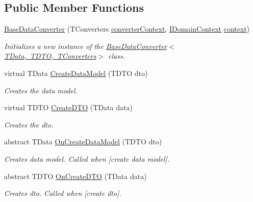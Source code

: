 \subsection*{Public Member Functions}
\begin{DoxyCompactItemize}
\item 
\mbox{\hyperlink{class_bar_none_1_1_shared_1_1_data_converter_1_1_core_1_1_base_data_converter_a8c324ead3d3b0d42f816050dbbd42f36}{Base\+Data\+Converter}} (T\+Converters \mbox{\hyperlink{class_bar_none_1_1_shared_1_1_data_converter_1_1_core_1_1_base_data_converter_aa680c5a5e00d4330616f98e3cacffa42}{converter\+Context}}, \mbox{\hyperlink{interface_bar_none_1_1_shared_1_1_core_1_1_i_domain_context}{I\+Domain\+Context}} \mbox{\hyperlink{class_bar_none_1_1_shared_1_1_data_converter_1_1_core_1_1_base_data_converter_ae96bc28386162a9cff2a303c270a12b4}{context}})
\begin{DoxyCompactList}\small\item\em Initializes a new instance of the \mbox{\hyperlink{class_bar_none_1_1_shared_1_1_data_converter_1_1_core_1_1_base_data_converter_a8c324ead3d3b0d42f816050dbbd42f36}{Base\+Data\+Converter$<$\+T\+Data, T\+D\+T\+O, T\+Converters$>$}} class. \end{DoxyCompactList}\item 
virtual T\+Data \mbox{\hyperlink{class_bar_none_1_1_shared_1_1_data_converter_1_1_core_1_1_base_data_converter_aebffc229b5b94146a0741030b675cfd7}{Create\+Data\+Model}} (T\+D\+TO dto)
\begin{DoxyCompactList}\small\item\em Creates the data model. \end{DoxyCompactList}\item 
virtual T\+D\+TO \mbox{\hyperlink{class_bar_none_1_1_shared_1_1_data_converter_1_1_core_1_1_base_data_converter_afdcc049c759d824f4954a6be3e862482}{Create\+D\+TO}} (T\+Data data)
\begin{DoxyCompactList}\small\item\em Creates the dto. \end{DoxyCompactList}\item 
abstract T\+Data \mbox{\hyperlink{class_bar_none_1_1_shared_1_1_data_converter_1_1_core_1_1_base_data_converter_ad2f2df168940d52de8456f4fb2492d48}{On\+Create\+Data\+Model}} (T\+D\+TO dto)
\begin{DoxyCompactList}\small\item\em Creates data model. Called when \mbox{[}create data model\mbox{]}. \end{DoxyCompactList}\item 
abstract T\+D\+TO \mbox{\hyperlink{class_bar_none_1_1_shared_1_1_data_converter_1_1_core_1_1_base_data_converter_a160f22b1619b35aa369a0d5675e81820}{On\+Create\+D\+TO}} (T\+Data data)
\begin{DoxyCompactList}\small\item\em Creates dto. Called when \mbox{[}create dto\mbox{]}. \end{DoxyCompactList}\end{DoxyCompactItemize}
